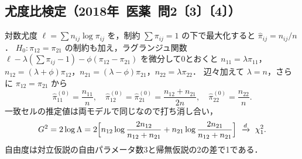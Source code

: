 \documentclass[a4paper,11pt,openany]{ltjsbook}
\newcommand{\kakomon}[2]{\mbox{#1年 医薬 問#2}}
\begin{document}
\subsection{尤度比検定（\kakomon{2018}{2}〔3〕〔4〕）}\label{subsec:04-mclrt}
対数尤度 $\ell=\sum n_{ij}\log\pi_{ij}$ を，制約 $\sum\pi_{ij}=1$ の下で最大化すると $\hat\pi_{ij}=n_{ij}/n$．
$H_0:\pi_{12}=\pi_{21}$ の制約も加え，ラグランジュ関数
$\ell-\lambda(\sum\pi_{ij}-1)-\phi(\pi_{12}-\pi_{21})$ を微分して0とおくと
$n_{11}=\lambda\pi_{11}$，$n_{12}=(\lambda+\phi)\pi_{12}$，$n_{21}=(\lambda-\phi)\pi_{21}$，$n_{22}=\lambda\pi_{22}$．
辺々加えて $\lambda=n$，さらに $\pi_{12}=\pi_{21}$ から
\[
\hat\pi_{11}^{(0)}=\frac{n_{11}}{n},\quad \hat\pi_{12}^{(0)}=\hat\pi_{21}^{(0)}=\frac{n_{12}+n_{21}}{2n},\quad \hat\pi_{22}^{(0)}=\frac{n_{22}}{n}.
\]
一致セルの推定値は両モデルで同じなので打ち消し合い，
\begin{equation}
G^2=2\log\Lambda=2\Bigl[n_{12}\log\frac{2n_{12}}{n_{12}+n_{21}}+n_{21}\log\frac{2n_{21}}{n_{12}+n_{21}}\Bigr]\ \xrightarrow{d}\ \chi^2_1.\label{eq:04-mclrt}
\end{equation}
自由度は対立仮説の自由パラメータ数3と帰無仮説の2の差で1である．
\end{document}
